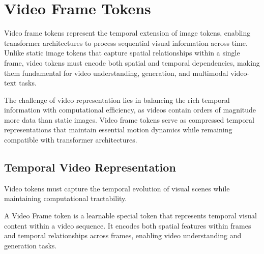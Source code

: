 
\section{Video Frame Tokens}

Video frame tokens represent the temporal extension of image tokens, enabling transformer architectures to process sequential visual information across time. Unlike static image tokens that capture spatial relationships within a single frame, video tokens must encode both spatial and temporal dependencies, making them fundamental for video understanding, generation, and multimodal video-text tasks.

The challenge of video representation lies in balancing the rich temporal information with computational efficiency, as videos contain orders of magnitude more data than static images. Video frame tokens serve as compressed temporal representations that maintain essential motion dynamics while remaining compatible with transformer architectures.

\subsection{Temporal Video Representation}

Video tokens must capture the temporal evolution of visual scenes while maintaining computational tractability.

\begin{definition}
A Video Frame token is a learnable special token that represents temporal visual content within a video sequence. It encodes both spatial features within frames and temporal relationships across frames, enabling video understanding and generation tasks.
\end{definition}

